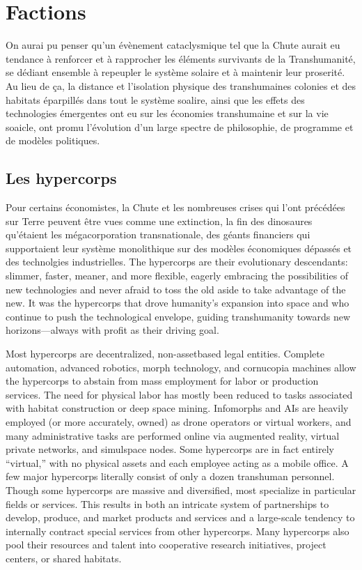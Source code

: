 \section{Factions} \label{sec:factions} 

On aurai pu penser qu'un évènement cataclysmique tel que la Chute aurait eu tendance à renforcer et à rapprocher les éléments survivants de la Transhumanité, se dédiant ensemble à repeupler le système solaire et à maintenir leur proserité. Au lieu de ça, la distance et l'isolation physique des transhumaines colonies et des habitats éparpillés dans tout le système soalire, ainsi que les effets des technologies émergentes ont eu sur les économies transhumaine et sur la vie soaicle, ont promu l'évolution d'un large spectre de philosophie, de programme et de modèles politiques. 

\subsection{Les hypercorps} \label{sec:hypercorps} 

Pour certains économistes, la Chute et les nombreuses crises qui l'ont précédées sur Terre peuvent être vues comme une extinction, la fin des dinosaures qu'étaient les mégacorporation transnationale, des géants financiers qui supportaient leur système monolithique sur des modèles économiques dépassés et des technolgies industrielles. The hypercorps are their evolutionary descendants: slimmer, faster, meaner, and more flexible, eagerly embracing the possibilities of new technologies and never afraid to toss the old aside to take advantage of the new. It was the hypercorps that drove humanity's expansion into space and who continue to push the technological envelope, guiding transhumanity towards new horizons—always with profit as their driving goal. 

Most hypercorps are decentralized, non-assetbased legal entities. Complete automation, advanced robotics, morph technology, and cornucopia machines allow the hypercorps to abstain from mass employment for labor or production services. The need for physical labor has mostly been reduced to tasks associated with habitat construction or deep space mining. Infomorphs and AIs are heavily employed (or more accurately, owned) as drone operators or virtual workers, and many administrative tasks are performed online via augmented reality, virtual private networks, and simulspace nodes. Some hypercorps are in fact entirely “virtual,” with no physical assets and each employee acting as a mobile office. A few major hypercorps literally consist of only a dozen transhuman personnel. Though some hypercorps are massive and diversified, most specialize in particular fields or services. This results in both an intricate system of partnerships to develop, produce, and market products and services and a large-scale tendency to internally contract special services from other hypercorps. Many hypercorps also pool their resources and talent into cooperative research initiatives, project centers, or shared habitats. 

